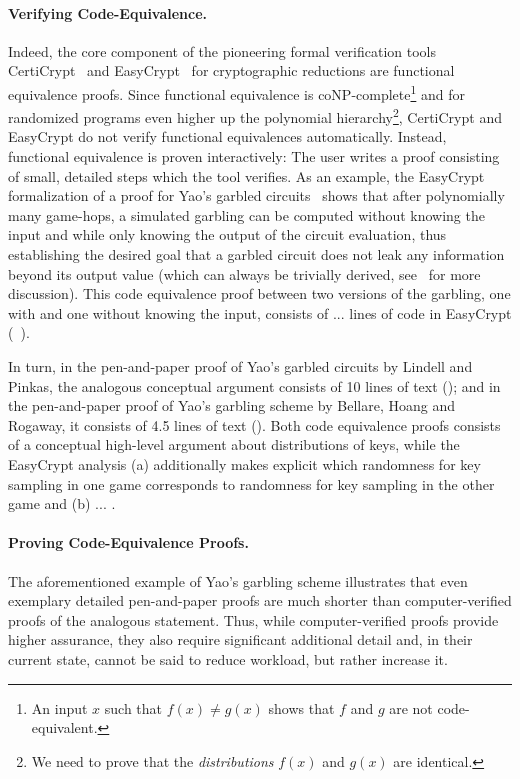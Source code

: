 \paragraph{Verifying Code-Equivalence.}
Indeed, the core component of the pioneering formal
verification tools CertiCrypt~\cite{X} and EasyCrypt~\cite{X} for 
cryptographic reductions are functional equivalence proofs. Since functional 
equivalence is coNP-complete\footnote{An input $x$ such that 
$f(x)\neq g(x)$ shows that $f$ and $g$ are not code-equivalent.} and 
for randomized programs even higher up the polynomial hierarchy\footnote{We need to prove that the \emph{distributions} $f(x)$ and $g(x)$ are identical.}, 
CertiCrypt and EasyCrypt do not verify functional equivalences automatically.
Instead, functional equivalence is proven interactively: The user writes
a proof consisting of small, detailed steps which the tool verifies.
As an example, the EasyCrypt formalization
of a proof for Yao's garbled circuits~\cite{X} shows that after polynomially many game-hops, a simulated garbling can be computed without knowing the input and while only knowing the output of the circuit evaluation, thus establishing the desired goal that a garbled circuit does not leak any information beyond its output value (which can
always be trivially derived, see~\cite{X} for more discussion). This code equivalence proof between two versions of the garbling, one with and one without
knowing the input, consists of ... lines of code in EasyCrypt (~\cite[page x]{X}).

In turn, in the pen-and-paper proof of Yao's garbled circuits by Lindell and Pinkas, the analogous conceptual argument consists of 10 lines of text (\cite[page 23]{X}); and in the pen-and-paper proof of Yao's garbling scheme by Bellare, Hoang and Rogaway, it consists of 4.5 lines of text (\cite[bottom of page 22]{X}). Both code equivalence proofs consists of a conceptual high-level argument about distributions of keys, while the EasyCrypt analysis (a) additionally makes explicit which randomness for key sampling in one game corresponds to randomness for key sampling in the other game and (b) ... .

\paragraph{Proving Code-Equivalence Proofs.}
The aforementioned example of Yao's garbling scheme illustrates that even
exemplary detailed pen-and-paper proofs are much shorter than computer-verified
proofs of the analogous statement. Thus, while computer-verified proofs provide
higher assurance, they also require significant additional detail and, in their
current state, cannot be said to reduce workload, but rather increase it.

